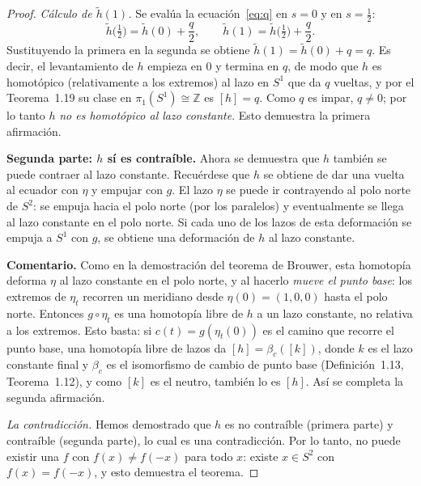 \documentclass[11pt]{article}
\begin{document}
\begin{proof}
\medskip
\textit{Cálculo de $\tilde h(1)$.} Se evalúa la ecuación~\eqref{eq:q} en $s=0$ y en $s=\tfrac12$:
\[
  \tilde h\bigl(\tfrac12\bigr)=\tilde h(0)+\frac q2,\qquad
  \tilde h(1)=\tilde h\bigl(\tfrac12\bigr)+\frac q2 .
\]
Sustituyendo la primera en la segunda se obtiene $\tilde h(1)=\tilde h(0)+q=q$. Es decir, el levantamiento de $h$ empieza en $0$ y termina en $q$, de modo que $h$ es homotópico (relativamente a los extremos) al lazo en $S^1$ que da $q$ vueltas, y por el Teorema~1.19 su clase en $\pi_1(S^1)\cong\mathbb{Z}$ es $[h]=q$. Como $q$ es impar, $q\neq 0$; por lo tanto $h$ \emph{no es homotópico al lazo constante}. Esto demuestra la primera afirmación.

\medskip\noindent\textbf{Segunda parte: $h$ sí es contraíble.}
Ahora se demuestra que $h$ también se puede contraer al lazo constante. Recuérdese que $h$ se obtiene de dar una vuelta al ecuador con $\eta$ y empujar con $g$. El lazo $\eta$ se puede ir contrayendo al polo norte de $S^2$: se empuja hacia el polo norte (por los paralelos) y eventualmente se llega al lazo constante en el polo norte. Si cada uno de los lazos de esta deformación se empuja a $S^1$ con $g$, se obtiene una deformación de $h$ al lazo constante.

\medskip\noindent\textbf{Comentario.} Como en la demostración del teorema de Brouwer, esta homotopía deforma $\eta$ al lazo constante en el polo norte, y al hacerlo \emph{mueve el punto base}: los extremos de $\eta_t$ recorren un meridiano desde $\eta(0)=(1,0,0)$ hasta el polo norte. Entonces $g\circ\eta_t$ es una homotopía libre de $h$ a un lazo constante, no relativa a los extremos. Esto basta: si $c(t)=g(\eta_t(0))$ es el camino que recorre el punto base, una homotopía libre de lazos da $[h]=\beta_c([k])$, donde $k$ es el lazo constante final y $\beta_c$ es el isomorfismo de cambio de punto base (Definición~1.13, Teorema~1.12), y como $[k]$ es el neutro, también lo es $[h]$. Así se completa la segunda afirmación.

\medskip\noindent\textit{La contradicción.}
Hemos demostrado que $h$ es no contraíble (primera parte) y contraíble (segunda parte), lo cual es una contradicción. Por lo tanto, no puede existir una $f$ con $f(x)\neq f(-x)$ para todo $x$: existe $x\in S^2$ con $f(x)=f(-x)$, y esto demuestra el teorema.
\end{proof}

\begin{erratas}
\end{erratas}
\end{document}
